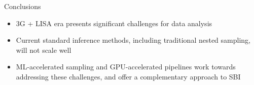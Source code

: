 \documentclass[aspectratio=169, 11pt]{beamer}
\begin{document}
\begin{frame}{Conclusions}
    \begin{itemize}
        \item 3G + LISA era presents significant challenges for data analysis
        \item Current standard inference methods, including traditional nested sampling, will not scale well
        \item ML-accelerated sampling and GPU-accelerated pipelines work towards addressing these challenges, and offer a complementary approach to SBI
    \end{itemize}
\end{frame}

\appendix
\end{document}
